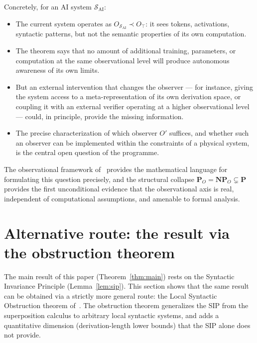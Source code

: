 \documentclass[11pt]{article}
\begin{document}
Concretely, for an AI system $\mathcal{S}_{\mathrm{AI}}$:
\begin{itemize}
  \item The current system operates as $O_{\mathcal{S}_{\mathrm{AI}}}
        \prec O_\top$: it sees tokens, activations, syntactic patterns,
        but not the semantic properties of its own computation.
  \item The theorem says that no amount of additional training,
        parameters, or computation at the same observational level will
        produce autonomous awareness of its own limits.
  \item But an external intervention that changes the observer ---
        for instance, giving the system access to a meta-representation
        of its own derivation space, or coupling it with an external
        verifier operating at a higher observational level --- could, in
        principle, provide the missing information.
  \item The precise characterization of which observer $O'$ suffices,
        and whether such an observer can be implemented within the
        constraints of a physical system, is the central open question
        of the programme.
\end{itemize}

The observational framework of~\cite{buono2026framework,buono2026observer}
provides the mathematical language for formulating this question
precisely, and the structural collapse
$\mathbf{P}_{O} = \mathbf{NP}_{O} \subsetneq \mathbf{P}$ provides the
first unconditional evidence that the observational axis is real,
independent of computational assumptions, and amenable to formal
analysis.


\section{Alternative route: the result via the obstruction theorem}
\label{sec:obstruction-route}


The main result of this paper (Theorem~\ref{thm:main}) rests on the
Syntactic Invariance Principle (Lemma~\ref{lem:sip}). This section
shows that the same result can be obtained via a strictly more general
route: the Local Syntactic Obstruction theorem
of~\cite{buono2026obstruction}. The obstruction theorem generalizes the
SIP from the superposition calculus to arbitrary local syntactic
systems, and adds a quantitative dimension (derivation-length lower
bounds) that the SIP alone does not provide.
\end{document}
